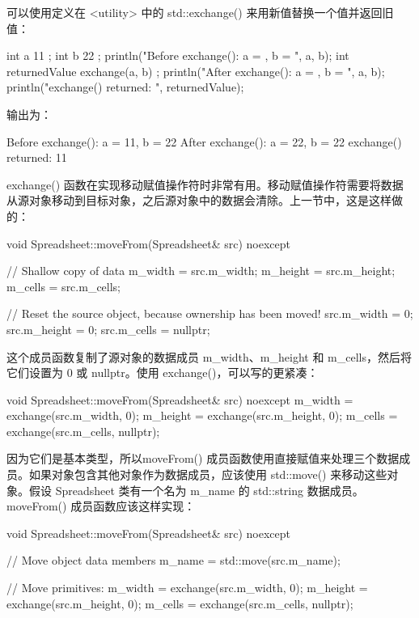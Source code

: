 
可以使用定义在  <utility> 中的 std::exchange() 来用新值替换一个值并返回旧值：

\begin{cpp}
int a { 11 };
int b { 22 };
println("Before exchange(): a = {}, b = {}", a, b);
int returnedValue { exchange(a, b) };
println("After exchange(): a = {}, b = {}", a, b);
println("exchange() returned: {}", returnedValue);
\end{cpp}

输出为：

\begin{shell}
Before exchange(): a = 11, b = 22
After exchange(): a = 22, b = 22
exchange() returned: 11
\end{shell}

exchange() 函数在实现移动赋值操作符时非常有用。移动赋值操作符需要将数据从源对象移动到目标对象，之后源对象中的数据会清除。上一节中，这是这样做的：

\begin{cpp}
void Spreadsheet::moveFrom(Spreadsheet& src) noexcept
{
    // Shallow copy of data
    m_width = src.m_width;
    m_height = src.m_height;
    m_cells = src.m_cells;

    // Reset the source object, because ownership has been moved!
    src.m_width = 0;
    src.m_height = 0;
    src.m_cells = nullptr;
}
\end{cpp}

这个成员函数复制了源对象的数据成员 m\_width、m\_height 和 m\_cells，然后将它们设置为 0 或 nullptr。使用 exchange()，可以写的更紧凑：

\begin{cpp}
void Spreadsheet::moveFrom(Spreadsheet& src) noexcept
{
    m_width = exchange(src.m_width, 0);
    m_height = exchange(src.m_height, 0);
    m_cells = exchange(src.m_cells, nullptr);
}
\end{cpp}


因为它们是基本类型，所以moveFrom() 成员函数使用直接赋值来处理三个数据成员。如果对象包含其他对象作为数据成员，应该使用 std::move() 来移动这些对象。假设 Spreadsheet 类有一个名为 m\_name 的 std::string 数据成员。moveFrom() 成员函数应该这样实现：

\begin{cpp}
void Spreadsheet::moveFrom(Spreadsheet& src) noexcept
{
    // Move object data members
    m_name = std::move(src.m_name);

    // Move primitives:
    m_width = exchange(src.m_width, 0);
    m_height = exchange(src.m_height, 0);
    m_cells = exchange(src.m_cells, nullptr);
}
\end{cpp}

